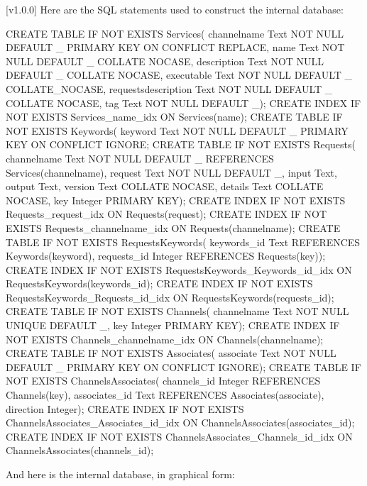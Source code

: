 [v1.0.0]
%
Here are the SQL statements used to construct the internal database:
\outputBegin{}
\begin{listing}[5]{1}
CREATE TABLE IF NOT EXISTS Services(
       channelname Text NOT NULL DEFAULT _ PRIMARY KEY ON CONFLICT REPLACE,
       name Text NOT NULL DEFAULT _ COLLATE NOCASE,
       description Text NOT NULL DEFAULT _ COLLATE NOCASE,
       executable Text NOT NULL DEFAULT _ COLLATE_NOCASE,
       requestsdescription Text NOT NULL DEFAULT _ COLLATE NOCASE,
       tag Text NOT NULL DEFAULT  _);
CREATE INDEX IF NOT EXISTS Services_name_idx ON Services(name);
CREATE TABLE IF NOT EXISTS Keywords(
       keyword Text NOT NULL DEFAULT _ PRIMARY KEY ON CONFLICT IGNORE;
CREATE TABLE IF NOT EXISTS Requests(
       channelname Text NOT NULL DEFAULT _ REFERENCES Services(channelname),
       request Text NOT NULL DEFAULT _,
       input Text,
       output Text,
       version Text COLLATE NOCASE,
       details Text COLLATE NOCASE,
       key Integer PRIMARY KEY);
CREATE INDEX IF NOT EXISTS Requests_request_idx ON Requests(request);
CREATE INDEX IF NOT EXISTS Requests_channelname_idx ON Requests(channelname);
CREATE TABLE IF NOT EXISTS RequestsKeywords(
       keywords_id Text REFERENCES Keywords(keyword),
       requests_id Integer REFERENCES Requests(key));
CREATE INDEX IF NOT EXISTS RequestsKeywords_Keywords_id_idx ON
       RequestsKeywords(keywords_id);
CREATE INDEX IF NOT EXISTS RequestsKeywords_Requests_id_idx ON
       RequestsKeywords(requests_id);
CREATE TABLE IF NOT EXISTS Channels(
       channelname Text NOT NULL UNIQUE DEFAULT _,
       key Integer PRIMARY KEY);
CREATE INDEX IF NOT EXISTS Channels_channelname_idx ON Channels(channelname);
CREATE TABLE IF NOT EXISTS Associates(
       associate Text NOT NULL DEFAULT _ PRIMARY KEY ON CONFLICT IGNORE);
CREATE TABLE IF NOT EXISTS ChannelsAssociates(
       channels_id Integer REFERENCES Channels(key),
       associates_id Text REFERENCES Associates(associate),
       direction Integer);
CREATE INDEX IF NOT EXISTS ChannelsAssociates_Associates_id_idx ON
       ChannelsAssociates(associates_id);
CREATE INDEX IF NOT EXISTS ChannelsAssociates_Channels_id_idx ON
       ChannelsAssociates(channels_id);
\end{listing}
\outputEnd{}
\condPage{}
And here is the internal database, in graphical form:\\
\appendixEnd{}
